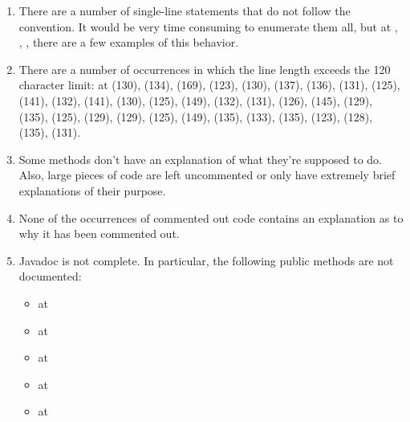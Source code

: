 \begin{enumerate}
	\item {} There are a number of single-line  statements that do not follow the convention. It would be very time consuming to enumerate them all, but at , , ,  there are a few examples of this behavior. 
	\item {} There are a number of occurrences in which the line length exceeds the 120 character limit: at (130), (134), (169), (123), (130), (137), (136), (131), (125), (141), (132), (141), (130), (125), (149), (132), (131), (126), (145), (129), (135), (125), (129), (129), (125), (149), (135), (133), (135), (123), (128), (135), (131).
	\item {} Some methods don't have an explanation of what they're supposed to do. Also, large pieces of code are left uncommented or only have extremely brief explanations of their purpose. 
	\item {} None of the occurrences of commented out code contains an explanation as to why it has been commented out. 
	\item {} Javadoc is not complete. In particular, the following public methods are not documented: 
		\begin{itemize}
		\item {} at 
		\item {} at 
		\item {} at 
		\item {} at  
		\item {} at 

\end{itemize}
\end{enumerate}
